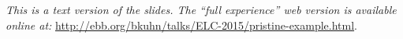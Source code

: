\begin{center}
\textit{
This is a text version of the slides. The ``full experience'' web version is available
online at:} \url{http://ebb.org/bkuhn/talks/ELC-2015/pristine-example.html}.

\end{center}
